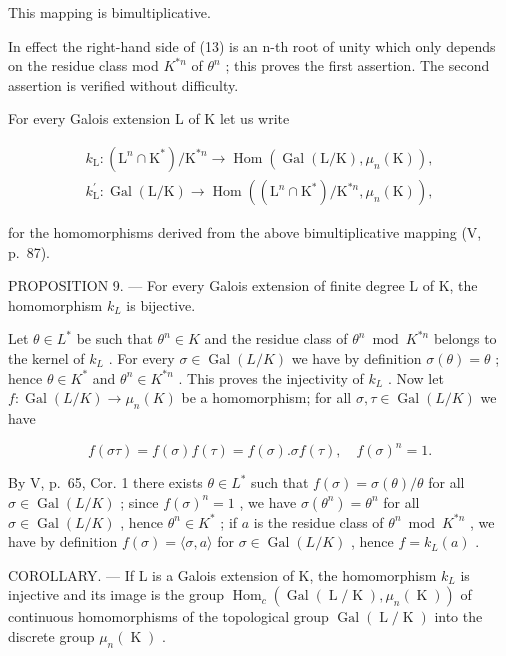 This mapping is bimultiplicative.

In effect the right-hand side of (13) is an n-th root of unity which only depends on the residue class mod \(K^{*n}\) of \(\theta^{n}\) ; this proves the first assertion. The second assertion is verified without difficulty.

For every Galois extension L of K let us write

\[
\begin{array}{l} k _ {\mathrm{L}} \colon (\mathrm{L} ^ {n} \cap \mathrm{K} ^ {*}) / \mathrm{K} ^ {* n} \to \operatorname{Hom} \left(\operatorname{Gal} (\mathrm{L} / \mathrm{K}),   \mu_ {n} (\mathrm{K})\right), \\ k _ {\mathrm{L}} ^ {\prime} \colon \operatorname{Gal} (\mathrm{L} / \mathrm{K}) \to \operatorname{Hom} \left((\mathrm{L} ^ {n} \cap \mathrm{K} ^ {*}) / \mathrm{K} ^ {* n},   \mu_ {n} (\mathrm{K})\right), \end{array}
\]

for the homomorphisms derived from the above bimultiplicative mapping (V, p.~87).

PROPOSITION 9. --- For every Galois extension of finite degree L of K, the homomorphism \(k_{L}\) is bijective.

Let \(\theta \in L^{*}\) be such that \(\theta^n \in K\) and the residue class of \(\theta^n \bmod K^{*n}\) belongs to the kernel of \(k_{L}\) . For every \(\sigma \in \operatorname{Gal}(L/K)\) we have by definition \(\sigma(\theta) = \theta\) ; hence \(\theta \in K^{*}\) and \(\theta^n \in K^{*n}\) . This proves the injectivity of \(k_{L}\) . Now let \(f: \operatorname{Gal}(L/K) \to \mu_n(K)\) be a homomorphism; for all \(\sigma, \tau \in \operatorname{Gal}(L/K)\) we have

\[
f (\sigma \tau) = f (\sigma) f (\tau) = f (\sigma). \sigma f (\tau), \quad f (\sigma) ^ {n} = 1.
\]

By V, p.~65, Cor. 1 there exists \(\theta \in L^{*}\) such that \(f(\sigma) = \sigma(\theta)/\theta\) for all \(\sigma \in \operatorname{Gal}(L/K)\) ; since \(f(\sigma)^{n} = 1\) , we have \(\sigma(\theta^{n}) = \theta^{n}\) for all \(\sigma \in \operatorname{Gal}(L/K)\) , hence \(\theta^{n} \in K^{*}\) ; if \(a\) is the residue class of \(\theta^{n} \bmod K^{*n}\) , we have by definition \(f(\sigma) = \langle \sigma, a \rangle\) for \(\sigma \in \operatorname{Gal}(L/K)\) , hence \(f = k_{L}(a)\) .

COROLLARY. --- If L is a Galois extension of K, the homomorphism \(k_{L}\) is injective and its image is the group \(\operatorname{Hom}_{c}(\operatorname{Gal}(\operatorname{L}/\operatorname{K}), \mu_{n}(\operatorname{K}))\) of continuous homomorphisms of the topological group \(\operatorname{Gal}(\operatorname{L}/\operatorname{K})\) into the discrete group \(\mu_{n}(\operatorname{K})\) .

